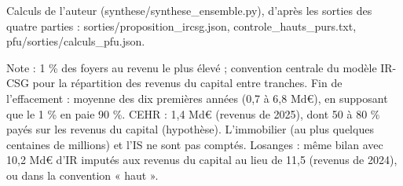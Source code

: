 Calculs de l'auteur (synthese/synthese\_ensemble.py), d'après les sorties des quatre parties : sorties/proposition\_ircsg.json, controle\_hauts\_purs.txt, pfu/sorties/calculs\_pfu.json.\par Note : 1 \% des foyers au revenu le plus élevé ; convention centrale du modèle IR-CSG pour la répartition des revenus du capital entre tranches. Fin de l'effacement : moyenne des dix premières années (0,7 à 6,8 Md\euro{}), en supposant que le 1 \% en paie 90 \%. CEHR : 1,4 Md\euro{} (revenus de 2025), dont 50 à 80 \% payés sur les revenus du capital (hypothèse). L'immobilier (au plus quelques centaines de millions) et l'IS ne sont pas comptés. Losanges : même bilan avec 10,2 Md\euro{} d'IR imputés aux revenus du capital au lieu de 11,5 (revenus de 2024), ou dans la convention « haut ».
